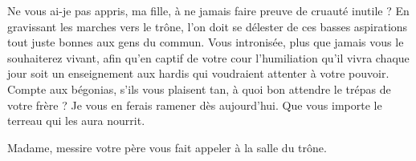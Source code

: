 \begin{drama}
  \reinespeaks Ne vous ai-je pas appris, ma fille, à ne jamais faire preuve de cruauté inutile ? En gravissant les marches vers le trône, l’on doit se délester de ces basses aspirations tout juste bonnes aux gens du commun. Vous intronisée, plus que jamais vous le souhaiterez vivant, afin qu’en captif de votre cour l’humiliation qu’il vivra chaque jour soit un enseignement aux hardis qui voudraient attenter à votre pouvoir. Compte aux bégonias, s’ils vous plaisent tan, à quoi bon attendre le trépas de votre frère ? Je vous en ferais ramener dès aujourd’hui. Que vous importe le terreau qui les aura nourrit.

  \suivanteprincessespeaks Madame, messire votre père vous fait appeler à la salle du trône.
%
%
%
\end{drama}

\scene

\StageDirII{\roi, \reine, \princesse, \elena, \alexas, \general}


